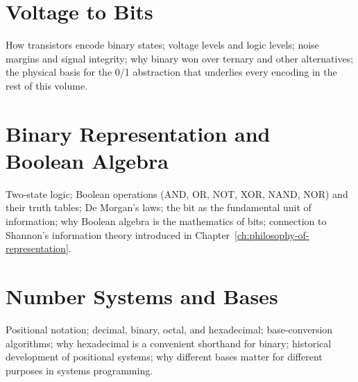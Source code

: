 %

\chapter{Voltage to Bits}
\label{ch:voltage-to-bits}

How transistors encode binary states; voltage levels and logic levels; noise
margins and signal integrity; why binary won over ternary and other
alternatives; the physical basis for the 0/1 abstraction that underlies
every encoding in the rest of this volume.

\chapter{Binary Representation and Boolean Algebra}
\label{ch:binary-boolean}

Two-state logic; Boolean operations (AND, OR, NOT, XOR, NAND, NOR) and their
truth tables; De Morgan's laws; the bit as the fundamental unit of
information; why Boolean algebra is the mathematics of bits; connection
to Shannon's information theory introduced in
Chapter~\ref{ch:philosophy-of-representation}.

\chapter{Number Systems and Bases}
\label{ch:number-systems}

Positional notation; decimal, binary, octal, and hexadecimal; base-conversion
algorithms; why hexadecimal is a convenient shorthand for binary; historical
development of positional systems; why different bases matter for different
purposes in systems programming.


%

